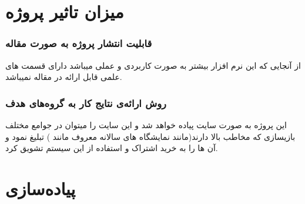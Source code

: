 \documentclass[10pt,a4paper]{article}
\begin{document}
\part{
میزان تاثیر پروژه
}
\section{
قابلیت انتشار پروژه به صورت مقاله
}
از آنجایی که این نرم افزار بیشتر به صورت کاربردی و عملی میباشد دارای قسمت های علمی قابل ارائه در مقاله نمیباشد.
\section{
روش ارائه‌ی نتایج کار به گروه‌های هدف
}
این پروژه به صورت سایت پیاده خواهد شد و این سایت را میتوان در جوامع مختلف بازیسازی که مخاطب بالا دارند(مانند نمایشگاه های سالانه معروف مانند
) تبلیغ نمود و آن ها را به خرید اشتراک و استفاده از این سیستم تشویق کرد.
	\newpage
\part{
پیاده‌سازی
}
\end{document}
